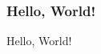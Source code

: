 \documentclass{beamer}
\title{}
\author{MicDZ}
\institute{长沙市长郡中学}
\date{September 12th, 2019}
\begin{document}
    \frame{\titlepage}%

    \begin{frame}
        \frametitle{Hello, World!}
        Hello, World!
    \end{frame}
\end{document}
